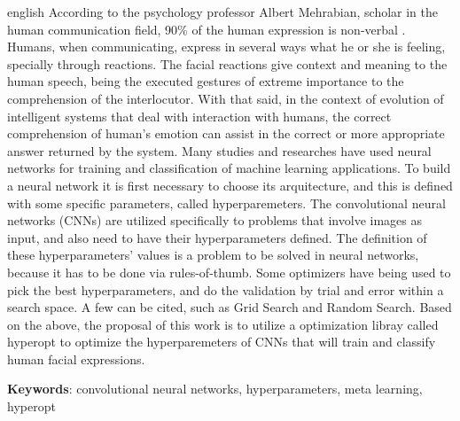 \documentclass[
12pt,       %
openright,      %
oneside,      %
a4paper,      %
english,      %
french,       %
spanish,      %
brazil        %
]{abntex2}
\begin{document}
% 
\begin{resumo}[Abstract]
  \begin{otherlanguage*}{english}
  According to the psychology professor Albert Mehrabian, scholar in the human communication field, 90\% of the human expression is non-verbal \cite{mehrabian1971silent}. Humans, when communicating, express in several ways what he or she is feeling, specially through reactions. The facial reactions give context and meaning to the human speech, being the executed gestures of extreme importance to the comprehension of the interlocutor. With that said, in the context of evolution of intelligent systems that deal with interaction with humans, the correct comprehension of human's emotion can assist in the correct or more appropriate answer returned by the system. Many studies and researches have used neural networks for training and classification of machine learning applications. To build a neural network it is first necessary to choose its arquitecture, and this is defined with some specific parameters, called hyperparemeters. The convolutional neural networks (CNNs) are utilized specifically to problems that involve images as input, and also need to have their hyperparameters defined. The definition of these hyperparameters' values is a problem to be solved in neural networks, because it has to be done via rules-of-thumb. Some optimizers have being used to pick the best hyperparameters, and do the validation by trial and error within a search space. A few can be cited, such as Grid Search and Random Search. Based on the above, the proposal of this work is to utilize a optimization libray called hyperopt to optimize the hyperparemeters of CNNs that will train and classify human facial expressions.
  
  
  \textbf{Keywords}: convolutional neural networks, hyperparameters, meta learning, hyperopt
  \end{otherlanguage*}
\end{resumo}

\cleardoublepage

\listoffigures*
\cleardoublepage


\listoftables*
\cleardoublepage
\end{document}
